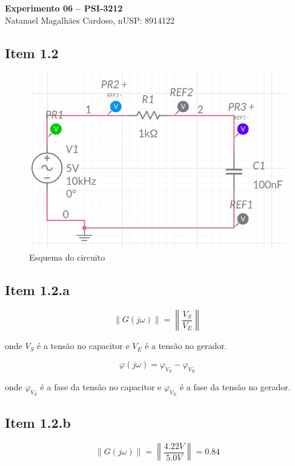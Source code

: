 \documentclass[11pt]{article}
\begin{document}
\begin{center}
  \textbf{Experimento 06 -- PSI-3212} \\
  Natanael Magalhães Cardoso, nUSP: 8914122
\end{center}

\vspace{2cm}

\subsection*{Item 1.2}

\begin{figure}[h!]
  \centering
  \includegraphics[width=.82\textwidth]{fig/1_circuito}
  \caption{Esquema do circuito}
  \label{fig:circ1}
\end{figure}

\subsection*{Item 1.2.a}

$$
  \left\|G(j\omega)\right\| = \left\|\frac{V_{S}}{V_{E}}\right\|
$$

onde $V_{S}$ é a tensão no capacitor e $V_{E}$ é a tensão no gerador.

$$
  \varphi(j\omega) = \varphi_{V_{S}} - \varphi_{V_{E}}
$$

onde $\varphi_{V_{S}}$ é a fase da tensão no capacitor e $\varphi_{V_{E}}$ é a fase da tensão no gerador.

\subsection*{Item 1.2.b}

$$
  \left\|G(j\omega)\right\| = \left\|\frac{4.22V}{5.0V}\right\| = 0.84
$$
\end{document}
